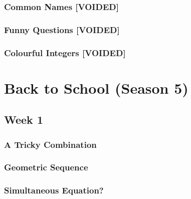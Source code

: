 \documentclass[titlepage=true]{scrartcl}
\begin{document}
        \subsubsection{Common Names \textbf[VOIDED]}
            \label{4-1-3}
            
        \newpage 
        
        \subsubsection{Funny Questions \textbf[VOIDED]}
            \label{4-1-4}
            
        \newpage 
    
        \subsubsection{Colourful Integers \textbf[VOIDED]}
            \label{4-1-5}
            
        \newpage 

\section{Back to School (Season 5) }
            
    \subsection{Week 1}

    \subsubsection{A Tricky Combination}
        \label{5-1-1}
        
    \newpage 

    \subsubsection{Geometric Sequence}
        \label{5-1-2}
        
    \newpage 

    \subsubsection{Simultaneous Equation?}
        \label{5-1-3}
        
    \newpage
\end{document}
